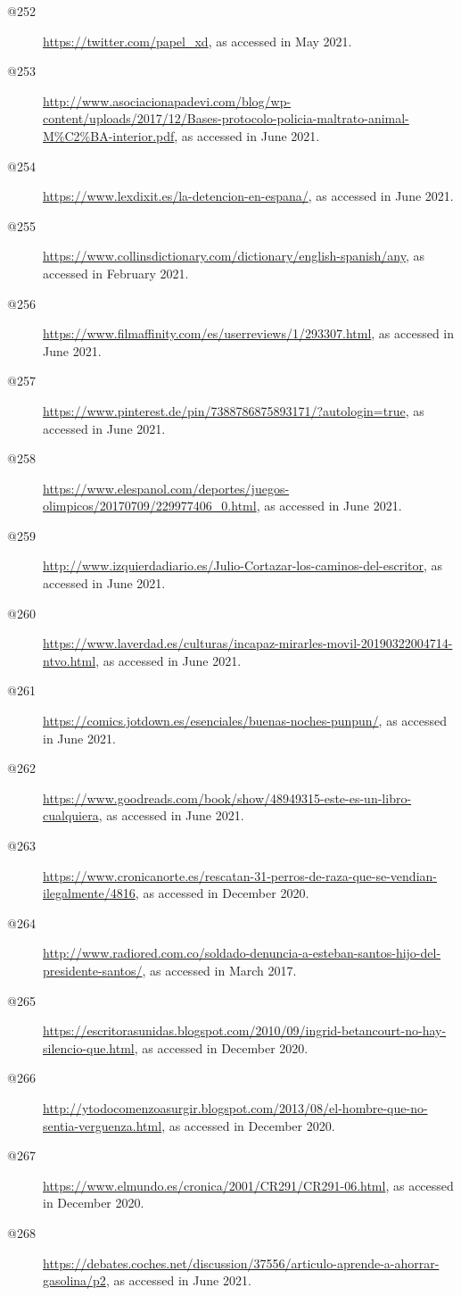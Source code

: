 \begin{flushleft}
\begin{description}
\item[@252]\url{https://twitter.com/papel_xd}, as accessed in May 2021.
\item[@253]\url{http://www.asociacionapadevi.com/blog/wp-content/uploads/2017/12/Bases-protocolo-policia-maltrato-animal-M\%C2\%BA-interior.pdf}, as accessed in June 2021.
\item[@254]\url{https://www.lexdixit.es/la-detencion-en-espana/}, as accessed in June 2021.
\item[@255]\url{https://www.collinsdictionary.com/dictionary/english-spanish/any}, as accessed in February 2021.
\item[@256]\url{https://www.filmaffinity.com/es/userreviews/1/293307.html}, as accessed in June 2021.
\item[@257]\url{https://www.pinterest.de/pin/7388786875893171/?autologin=true}, as accessed in June 2021.
\item[@258]\url{https://www.elespanol.com/deportes/juegos-olimpicos/20170709/229977406_0.html}, as accessed in June 2021.
\item[@259]\url{http://www.izquierdadiario.es/Julio-Cortazar-los-caminos-del-escritor}, as accessed in June 2021.
\item[@260]\url{https://www.laverdad.es/culturas/incapaz-mirarles-movil-20190322004714-ntvo.html}, as accessed in June 2021.
\item[@261]\url{https://comics.jotdown.es/esenciales/buenas-noches-punpun/}, as accessed in June 2021.
\item[@262]\url{https://www.goodreads.com/book/show/48949315-este-es-un-libro-cualquiera}, as accessed in June 2021.
\item[@263]\url{https://www.cronicanorte.es/rescatan-31-perros-de-raza-que-se-vendian-ilegalmente/4816}, as accessed in December 2020.
\item[@264]\url{http://www.radiored.com.co/soldado-denuncia-a-esteban-santos-hijo-del-presidente-santos/}, as accessed in March 2017.
\item[@265]\url{https://escritorasunidas.blogspot.com/2010/09/ingrid-betancourt-no-hay-silencio-que.html}, as accessed in December 2020.
\item[@266]\url{http://ytodocomenzoasurgir.blogspot.com/2013/08/el-hombre-que-no-sentia-verguenza.html}, as accessed in December 2020.
\item[@267]\url{https://www.elmundo.es/cronica/2001/CR291/CR291-06.html}, as accessed in December 2020.
\item[@268]\url{https://debates.coches.net/discussion/37556/articulo-aprende-a-ahorrar-gasolina/p2}, as accessed in June 2021.

\end{description}
\end{flushleft}
